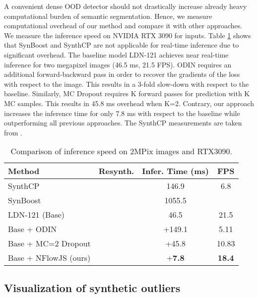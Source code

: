 \documentclass[lettersize,journal,hidelinks]{IEEEtran}
\newcommand{\cmark}{\ding{51}}
\newcommand{\xmark}{\ding{55}}
\begin{document}
A convenient dense OOD detector should not drastically increase already heavy computational burden of semantic segmentation.
Hence, we measure computational overhead of our method and compare it with other approaches.
We measure the inference speed on NVIDIA RTX 3090 for  inputs.
Table \ref{tbl:infer-speed} shows that SynBoost \cite{biase21cvpr} and SynthCP \cite{xia20eccv} are not applicable for real-time inference due to significant overhead.
The baseline model LDN-121 \cite{kreso21tits} achieves near real-time inference for two megapixel images (46.5 ms, 21.5 FPS).
ODIN \cite{liang18iclr} requires an additional forward-backward pass in order to recover the gradients of the loss with respect to the image.
This results in a 3-fold slow-down with respect to the baseline.
Similarly, MC Dropout \cite{kendall17nips} requires K forward passes for prediction with K MC samples.
This results in 45.8 ms overhead when K=2.
Contrary, our approach increases the inference time for only 7.8 ms with respect to the baseline while outperforming all previous approaches.
The SynthCP measurements are taken from \cite{jung21iccv}.
\begin{table}[ht]
\centering
\caption{Comparison of inference speed on 2MPix images and RTX3090.}
\label{tbl:infer-speed}
\begin{footnotesize}
\begin{tabular}{l|ccc}
\hline\hline
Method & Resynth. & Infer. Time (ms) &  FPS \\ \hline \hline
SynthCP \cite{xia20eccv} &\cmark & 146.9     & 6.8 \\ 
SynBoost \cite{biase21cvpr} & \cmark & 1055.5  &  \\ \hdashline
LDN-121 (Base) \cite{kreso21tits} & \xmark & 46.5& 21.5 \\ 
Base + ODIN \cite{liang18iclr} &\xmark & +149.1 & 5.11 \\
Base + MC=2 Dropout \cite{kendall17nips} &\xmark & +45.8 & 10.83\\
Base + NFlowJS (ours) &\xmark & +\textbf{7.8} & \textbf{18.4} \\ \hline
\end{tabular}
\end{footnotesize}
\end{table}

\subsection{Visualization of synthetic outliers}
\end{document}
